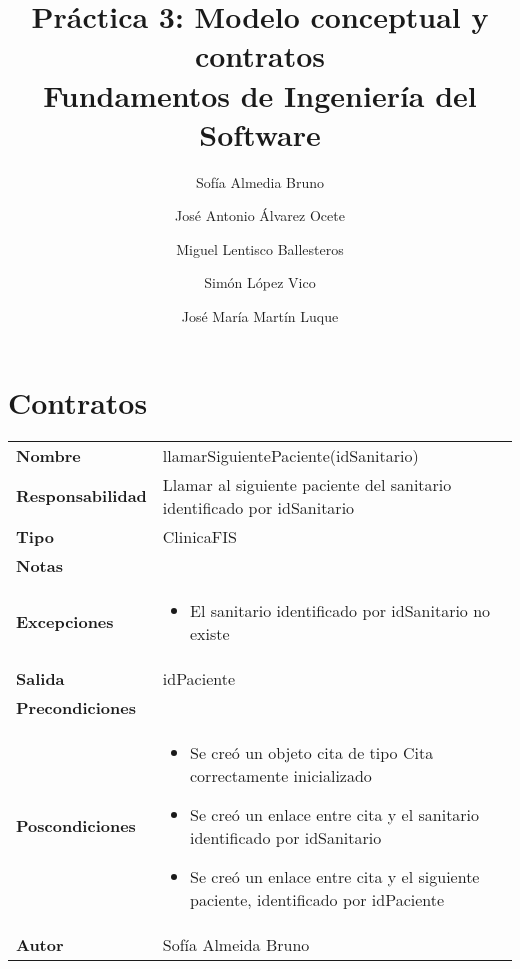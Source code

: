 \documentclass[11pt,a4paper]{article}
\title{Práctica 3: Modelo conceptual y contratos \large\\ Fundamentos de Ingeniería del Software}
\author{Sofía Almedia Bruno \and José Antonio Álvarez Ocete \and Miguel Lentisco Ballesteros \and Simón López Vico \and José María Martín Luque}
\begin{document}
\maketitle

\section{Contratos}

\begin{table}[H]
\centering
\label{my-label}
\begin{tabularx}{\textwidth}{l|X}
\textbf{Nombre}          & llamarSiguientePaciente(idSanitario) \\
\textbf{Responsabilidad} & Llamar al siguiente paciente del sanitario identificado por idSanitario \\
\textbf{Tipo}            & ClinicaFIS \\
\textbf{Notas}           &  \\
\textbf{Excepciones}     & 
\begin{itemize}
\item El sanitario identificado por idSanitario no existe
\end{itemize}\\
\textbf{Salida}          & idPaciente \\
\textbf{Precondiciones}  &  \\
\textbf{Poscondiciones}  &
\begin{itemize}
\item Se creó un objeto cita de tipo Cita correctamente inicializado
\item Se creó un enlace entre cita y el sanitario identificado por idSanitario
\item Se creó un enlace entre cita y el siguiente paciente, identificado por idPaciente 
\end{itemize}\\
\textbf{Autor} & Sofía Almeida Bruno\\
\end{tabularx}
\end{table}
\end{document}
